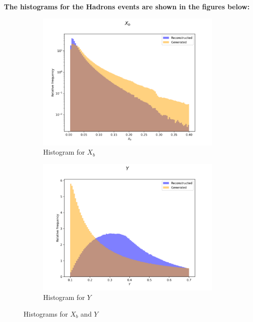 \documentclass{article}
\begin{document}
\textbf{The histograms for the Hadrons events are shown in the figures below:}

\begin{figure}[H]
    \centering
    \begin{subfigure}[b]{0.45\textwidth}
        \includegraphics[width=\textwidth]{graphs/hadr_X_b.png}
        \caption{Histogram for $X_b$}
        \label{fig:had_X_b}
    \end{subfigure}
    \hfill
    \begin{subfigure}[b]{0.45\textwidth}
        \includegraphics[width=\textwidth]{graphs/hadr_Y.png}
        \caption{Histogram for $Y$}
        \label{fig:had_Y}
    \end{subfigure}
    \caption{Histograms for $X_b$ and $Y$}
\end{figure}
\end{document}
